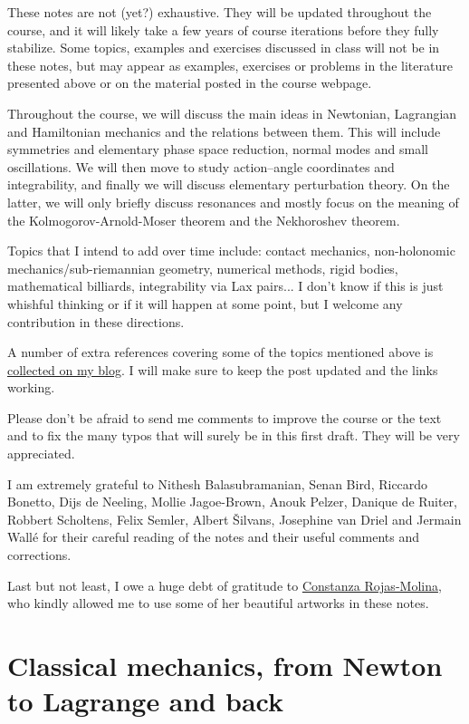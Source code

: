 \documentclass[english,fontsize=11pt,paper=a5,oneside]{scrbook}
\theoremstyle{definition}
\begin{document}
These notes are not (yet?) exhaustive.
They will be updated throughout the course, and it will likely take a few years of course iterations before they fully stabilize.
Some topics, examples and exercises discussed in class will not be in these notes, but may appear as examples, exercises or problems in the literature presented above or on the material posted in the course webpage.

Throughout the course, we will discuss the main ideas in Newtonian, Lagrangian and Hamiltonian mechanics and the relations between them.
This will include symmetries and elementary phase space reduction, normal modes and small oscillations.
We will then move to study action--angle coordinates and integrability, and finally we will discuss elementary perturbation theory.
On the latter, we will only briefly discuss resonances and mostly focus on the meaning of the Kolmogorov-Arnold-Moser theorem and the Nekhoroshev theorem.

Topics that I intend to add over time include: contact mechanics, non-holonomic mechanics/sub-riemannian geometry, numerical methods, rigid bodies, mathematical billiards, integrability via Lax pairs... I don't know if this is just whishful thinking or if it will happen at some point, but I welcome any contribution in these directions.

A number of extra references covering some of the topics mentioned above is \href{https://www.mseri.me/links-from-hm/}{collected on my blog}. I will make sure to keep the post updated and the links working. \medskip

Please don't be afraid to send me comments to improve the course or the text and to fix the many typos that will surely be in this first draft. They will be very appreciated.

I am extremely grateful to Nithesh Balasubramanian, Senan Bird, Riccardo Bonetto, Dijs de Neeling, Mollie Jagoe-Brown, Anouk Pelzer, Danique de Ruiter, Robbert Scholtens, Felix Semler, Albert \v{S}ilvans, Josephine van Driel and Jermain Wall\'e for their careful reading of the notes and their useful comments and corrections.

Last but not least, I owe a huge debt of gratitude to \href{https://crojasmolina.com}{Constanza Rojas-Molina}, who kindly allowed me to use some of her beautiful artworks in these notes.

\chapter{Classical mechanics, from Newton to Lagrange and back}
\end{document}
